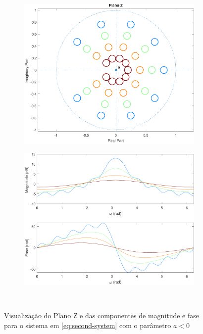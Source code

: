\documentclass[a4paper,11pt]{article}
\numberwithin{figure}{section}
\numberwithin{equation}{section}
\numberwithin{table}{section}
\theoremstyle{definition}
\begin{document}
\begin{figure}[ht]
\begin{subfigure}{0.44\textwidth}
		\includegraphics[width=\textwidth]{ex_3_pz_10}
	\end{subfigure}
	\begin{subfigure}{0.44\textwidth}
		\includegraphics[width=\textwidth]{ex_3_bode_10}
	\end{subfigure}\\
		
	\caption{Visualizaç\~ao do Plano Z e das componentes de magnitude e fase para o sistema em \eqref{eq:second-system} com o par\^ametro $a < 0$}
	\label{fig:03}
\end{figure}

\end{document}
